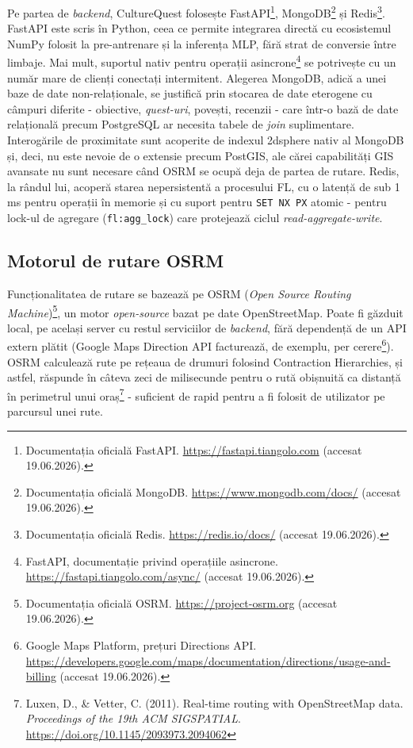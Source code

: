 \documentclass[12pt,a4paper]{report}
\begin{document}
Pe partea de \textit{backend}, CultureQuest folosește FastAPI\footnote{Documentația oficială FastAPI. \url{https://fastapi.tiangolo.com} (accesat 19.06.2026).}, MongoDB\footnote{Documentația oficială MongoDB. \url{https://www.mongodb.com/docs/} (accesat 19.06.2026).} și Redis\footnote{Documentația oficială Redis. \url{https://redis.io/docs/} (accesat 19.06.2026).}. FastAPI este scris în Python, ceea ce permite integrarea directă cu ecosistemul NumPy folosit la pre-antrenare și la inferența MLP, fără strat de conversie între limbaje. Mai mult, suportul nativ pentru operații asincrone\footnote{FastAPI, documentație privind operațiile asincrone. \url{https://fastapi.tiangolo.com/async/} (accesat 19.06.2026).} se potrivește cu un număr mare de clienți conectați intermitent. Alegerea MongoDB, adică a unei baze de date non-relaționale, se justifică prin stocarea de date eterogene cu câmpuri diferite - obiective, \textit{quest-uri}, povești, recenzii - care într-o bază de date relațională precum PostgreSQL ar necesita tabele de \textit{join} suplimentare. Interogările de proximitate sunt acoperite de indexul 2dsphere nativ al MongoDB și, deci, nu este nevoie de o extensie precum PostGIS, ale cărei capabilități GIS avansate nu sunt necesare când OSRM se ocupă deja de partea de rutare. Redis, la rândul lui, acoperă starea nepersistentă a procesului FL, cu o latență de sub 1 ms pentru operații în memorie și cu suport pentru \texttt{SET NX PX} atomic - pentru lock-ul de agregare (\texttt{fl:agg\_lock}) care protejează ciclul \textit{read-aggregate-write}.

\subsection{Motorul de rutare OSRM}

Funcționalitatea de rutare se bazează pe OSRM (\textit{Open Source Routing Machine})\footnote{Documentația oficială OSRM. \url{https://project-osrm.org} (accesat 19.06.2026).}, un motor \textit{open-source} bazat pe date OpenStreetMap. Poate fi găzduit local, pe același server cu restul serviciilor de \textit{backend}, fără dependență de un API extern plătit (Google Maps Direction API facturează, de exemplu, per cerere\footnote{Google Maps Platform, prețuri Directions API. \url{https://developers.google.com/maps/documentation/directions/usage-and-billing} (accesat 19.06.2026).}). OSRM calculează rute pe rețeaua de drumuri folosind Contraction Hierarchies, și astfel, răspunde în câteva zeci de milisecunde pentru o rută obișnuită ca distanță în perimetrul unui oraș\footnote{Luxen, D., \& Vetter, C. (2011). Real-time routing with OpenStreetMap data. \textit{Proceedings of the 19th ACM SIGSPATIAL}. \url{https://doi.org/10.1145/2093973.2094062}} - suficient de rapid pentru a fi folosit de utilizator pe parcursul unei rute.
\end{document}
